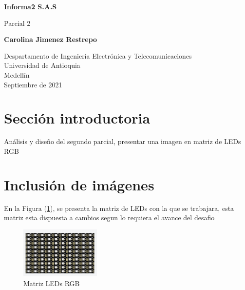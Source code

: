 \documentclass{article}
\begin{document}
\begin{titlepage}
    \begin{center}
        \vspace*{1cm}
            
        \Huge
        \textbf{Informa2 S.A.S}
            
        \vspace{0.5cm}
        \LARGE
        Parcial 2
            
        \vspace{1.5cm}
            
        \textbf{Carolina Jimenez Restrepo}
            
        \vfill
            
        \vspace{0.8cm}
            
        \Large
        Despartamento de Ingeniería Electrónica y Telecomunicaciones\\
        Universidad de Antioquia\\
        Medellín\\
        Septiembre de 2021
            
    \end{center}
\end{titlepage}

\tableofcontents
\newpage
\section{Sección introductoria}\label{intro}
Análisis y diseño del segundo parcial, presentar una imagen en matriz de LEDs RGB 



\section{Inclusión de imágenes} \label{imagenes}

En la Figura (\ref{fig:Matriz leds.png}), se presenta la matriz de LEDs con la que se trabajara, esta matriz esta dispuesta a cambios segun lo requiera el avance del desafio 

\begin{figure}[h]
\includegraphics[width=4cm]{Matriz leds.png}
\centering
\caption{Matriz LEDs RGB}
\label{fig:Matriz leds.png}
\end{figure}
\end{document}
